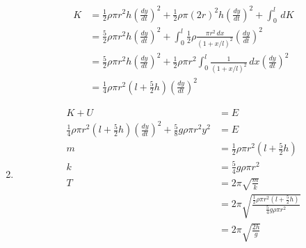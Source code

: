\documentclass{article}
\begin{document}
\begin{enumerate}
        \begin{align*}
          K & = \frac{1}{2} \rho \pi r^2 h \left( \frac{d y}{d t} \right)^2 + \frac{1}{2} \rho \pi (2 r)^2 h \left( \frac{d y}{d t} \right)^2 + \int_0^l \,dK                 \\
            & = \frac{5}{2} \rho \pi r^2 h \left( \frac{d y}{d t} \right)^2 + \int_0^l \frac{1}{2} \rho \frac{\pi r^2 \,dx}{(1 + x / l)^2} \left( \frac{d y}{d t} \right)^2   \\
            & = \frac{5}{2} \rho \pi r^2 h \left( \frac{d y}{d t} \right)^2 + \frac{1}{2} \rho \pi r^2 \int_0^l \frac{1}{(1 + x / l)^2} \,dx \left( \frac{d y}{d t} \right)^2 \\
            & = \frac{1}{4} \rho \pi r^2 \left( l + \frac{5}{2} h \right) \left( \frac{d y}{d t} \right)^2
        \end{align*}

  \item

        \begin{align*}
          K + U                                                                                                                       & = E                                                                                                         \\
          \frac{1}{4} \rho \pi r^2 \left( l + \frac{5}{2} h \right) \left( \frac{d y}{d t} \right)^2 + \frac{5}{8} g \rho \pi r^2 y^2 & = E                                                                                                         \\
          m                                                                                                                           & = \frac{1}{2} \rho \pi r^2 \left( l + \frac{5}{2} h \right)                                                 \\
          k                                                                                                                           & = \frac{5}{4} g \rho \pi r^2                                                                                \\
          T                                                                                                                           & = 2 \pi \sqrt{\frac{m}{k}}                                                                                  \\
                                                                                                                                      & = 2 \pi \sqrt{\frac{\frac{1}{2} \rho \pi r^2 \left( l + \frac{5}{2} h \right)}{\frac{5}{4} g \rho \pi r^2}} \\
                                                                                                                                      & = 2 \pi \sqrt{\frac{2 h}{g}}
        \end{align*}
\end{enumerate}
\end{document}
